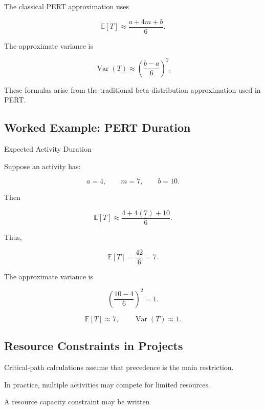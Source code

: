 The classical PERT approximation uses

\[
\boxed{
\mathbb{E}[T]
\approx
\frac{
a+4m+b
}{
6
}.
}
\]

The approximate variance is

\[
\boxed{
\operatorname{Var}(T)
\approx
\left(
\frac{
b-a
}{
6
}
\right)^2.
}
\]

These formulas arise from the traditional beta-distribution approximation
used in PERT.

\subsection{Worked Example: PERT Duration}
\label{subsec:worked-pert-duration}

\begin{workedexamplebox}{Expected Activity Duration}

Suppose an activity has:

\[
a=4,
\qquad
m=7,
\qquad
b=10.
\]

Then

\[
\mathbb{E}[T]
\approx
\frac{
4+4(7)+10
}{
6
}.
\]

Thus,

\[
\mathbb{E}[T]
=
\frac{42}{6}
=
7.
\]

The approximate variance is

\[
\left(
\frac{10-4}{6}
\right)^2
=
1.
\]

\begin{answerbox}
\[
\boxed{
\mathbb{E}[T]\approx7,
\qquad
\operatorname{Var}(T)\approx1.
}
\]
\end{answerbox}

\end{workedexamplebox}

\subsection{Resource Constraints in Projects}
\label{subsec:resource-constrained-projects}

Critical-path calculations assume that precedence is the main restriction.

In practice, multiple activities may compete for limited resources.

A resource capacity constraint may be written

